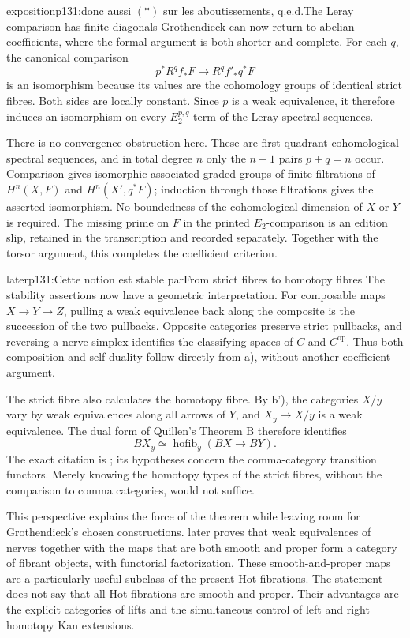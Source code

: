 \begin{dcomment}{exposition}{p131:donc aussi $(*)$ sur les aboutissements, q.e.d.}{The Leray comparison has finite diagonals}
Grothendieck can now return to abelian coefficients, where the formal argument is both shorter and complete. For each \(q\), the canonical comparison
\[
 p^*R^qf_*F\longrightarrow R^qf'_*q^*F
\]
is an isomorphism because its values are the cohomology groups of identical strict fibres. Both sides are locally constant. Since \(p\) is a weak equivalence, it therefore induces an isomorphism on every \(E_2^{p,q}\) term of the Leray spectral sequences.

There is no convergence obstruction here. These are first-quadrant cohomological spectral sequences, and in total degree \(n\) only the \(n+1\) pairs \(p+q=n\) occur. Comparison gives isomorphic associated graded groups of finite filtrations of \(H^n(X,F)\) and \(H^n(X',q^*F)\); induction through those filtrations gives the asserted isomorphism. No boundedness of the cohomological dimension of \(X\) or \(Y\) is required. The missing prime on \(F\) in the printed \(E_2\)-comparison is an edition slip, retained in the transcription and recorded separately. Together with the torsor argument, this completes the coefficient criterion.
\end{dcomment}

\begin{dcomment}{later}{p131:Cette notion est stable par}{From strict fibres to homotopy fibres}
The stability assertions now have a geometric interpretation. For composable maps \(X\longrightarrow Y\longrightarrow Z\), pulling a weak equivalence back along the composite is the succession of the two pullbacks. Opposite categories preserve strict pullbacks, and reversing a nerve simplex identifies the classifying spaces of \(C\) and \(C^{\mathrm{op}}\). Thus both composition and self-duality follow directly from a), without another coefficient argument.

The strict fibre also calculates the homotopy fibre. By b'), the categories \(X/y\) vary by weak equivalences along all arrows of \(Y\), and \(X_y\longrightarrow X/y\) is a weak equivalence. The dual form of Quillen's Theorem B therefore identifies
\[
 BX_y \simeq \operatorname{hofib}_y(BX\longrightarrow BY).
\]
The exact citation is \citet[\S1, Theorem B and its corollary]{Quillen1973}; its hypotheses concern the comma-category transition functors. Merely knowing the homotopy types of the strict fibres, without the comparison to comma categories, would not suffice.

This perspective explains the force of the theorem while leaving room for Grothendieck's chosen constructions. \citet[Proposition 4.4]{Cisinski2009LocallyConstant} later proves that weak equivalences of nerves together with the maps that are both smooth and proper form a category of fibrant objects, with functorial factorization. These smooth-and-proper maps are a particularly useful subclass of the present Hot-fibrations. The statement does not say that all Hot-fibrations are smooth and proper. Their advantages are the explicit categories of lifts and the simultaneous control of left and right homotopy Kan extensions.
\end{dcomment}

